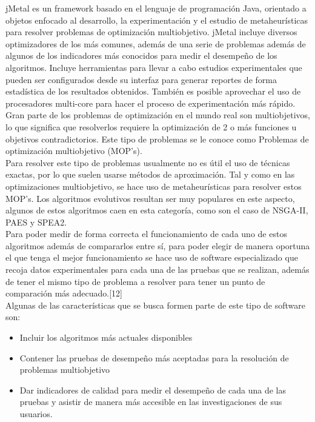 jMetal es un framework basado en el lenguaje de programación Java, orientado a objetos enfocado al desarrollo, la experimentación y el estudio de metaheurísticas para resolver problemas de optimización multiobjetivo. jMetal incluye diversos optimizadores de los más comunes, además de una serie de problemas además de algunos de los indicadores más conocidos para medir el desempeño de los algoritmos. Incluye herramientas para llevar a cabo estudios experimentales que pueden ser configurados desde su interfaz para generar reportes de forma estadística de los resultados obtenidos. También es posible  aprovechar el uso de procesadores multi-core para hacer el proceso de experimentación más rápido.\\

Gran parte de los problemas de optimización en el mundo real son multiobjetivos, lo que significa que resolverlos requiere la optimización de 2 o más funciones u objetivos contradictorios. Este tipo de problemas se le conoce como Problemas de optimización multiobjetivo (MOP's).\\

Para resolver este tipo de problemas usualmente no es útil el uso de técnicas exactas, por lo que suelen usarse métodos de aproximación. Tal y como en las optimizaciones multiobjetivo, se hace uso de metaheurísticas para resolver estos MOP's. Los algoritmos evolutivos resultan ser muy populares en este aspecto, algunos de estos algoritmos caen en esta categoría, como son el caso de NSGA-II, PAES y SPEA2.\\

Para poder medir de forma correcta el funcionamiento de cada uno de estos algoritmos además de compararlos entre sí, para poder elegir de manera oportuna el que tenga el mejor funcionamiento se hace uso de software especializado que recoja datos experimentales para cada una de las pruebas que se realizan, además de tener el mismo tipo de problema a resolver para tener un punto de comparación más adecuado.[12]\\

Algunas de las características que se busca formen parte de este tipo de software son:

\begin{itemize}
\item Incluir los algoritmos más actuales disponibles
\item Contener las pruebas de desempeño más aceptadas para la resolución de problemas multiobjetivo
\item Dar indicadores de calidad para medir el desempeño de cada una de las pruebas y asistir de manera más accesible en las investigaciones de sus usuarios.
\end{itemize}

